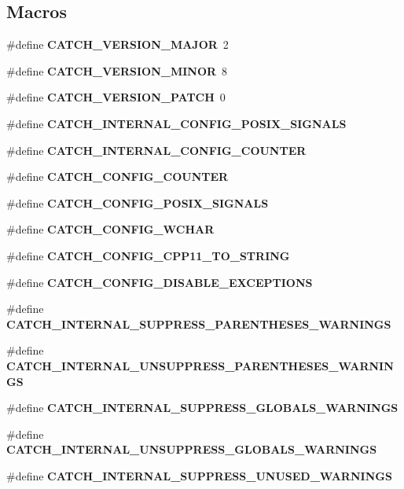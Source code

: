 \subsection*{Macros}
\begin{DoxyCompactItemize}
\item 
\#define \textbf{ C\+A\+T\+C\+H\+\_\+\+V\+E\+R\+S\+I\+O\+N\+\_\+\+M\+A\+J\+OR}~2
\item 
\#define \textbf{ C\+A\+T\+C\+H\+\_\+\+V\+E\+R\+S\+I\+O\+N\+\_\+\+M\+I\+N\+OR}~8
\item 
\#define \textbf{ C\+A\+T\+C\+H\+\_\+\+V\+E\+R\+S\+I\+O\+N\+\_\+\+P\+A\+T\+CH}~0
\item 
\#define \textbf{ C\+A\+T\+C\+H\+\_\+\+I\+N\+T\+E\+R\+N\+A\+L\+\_\+\+C\+O\+N\+F\+I\+G\+\_\+\+P\+O\+S\+I\+X\+\_\+\+S\+I\+G\+N\+A\+LS}
\item 
\#define \textbf{ C\+A\+T\+C\+H\+\_\+\+I\+N\+T\+E\+R\+N\+A\+L\+\_\+\+C\+O\+N\+F\+I\+G\+\_\+\+C\+O\+U\+N\+T\+ER}
\item 
\#define \textbf{ C\+A\+T\+C\+H\+\_\+\+C\+O\+N\+F\+I\+G\+\_\+\+C\+O\+U\+N\+T\+ER}
\item 
\#define \textbf{ C\+A\+T\+C\+H\+\_\+\+C\+O\+N\+F\+I\+G\+\_\+\+P\+O\+S\+I\+X\+\_\+\+S\+I\+G\+N\+A\+LS}
\item 
\#define \textbf{ C\+A\+T\+C\+H\+\_\+\+C\+O\+N\+F\+I\+G\+\_\+\+W\+C\+H\+AR}
\item 
\#define \textbf{ C\+A\+T\+C\+H\+\_\+\+C\+O\+N\+F\+I\+G\+\_\+\+C\+P\+P11\+\_\+\+T\+O\+\_\+\+S\+T\+R\+I\+NG}
\item 
\#define \textbf{ C\+A\+T\+C\+H\+\_\+\+C\+O\+N\+F\+I\+G\+\_\+\+D\+I\+S\+A\+B\+L\+E\+\_\+\+E\+X\+C\+E\+P\+T\+I\+O\+NS}
\item 
\#define \textbf{ C\+A\+T\+C\+H\+\_\+\+I\+N\+T\+E\+R\+N\+A\+L\+\_\+\+S\+U\+P\+P\+R\+E\+S\+S\+\_\+\+P\+A\+R\+E\+N\+T\+H\+E\+S\+E\+S\+\_\+\+W\+A\+R\+N\+I\+N\+GS}
\item 
\#define \textbf{ C\+A\+T\+C\+H\+\_\+\+I\+N\+T\+E\+R\+N\+A\+L\+\_\+\+U\+N\+S\+U\+P\+P\+R\+E\+S\+S\+\_\+\+P\+A\+R\+E\+N\+T\+H\+E\+S\+E\+S\+\_\+\+W\+A\+R\+N\+I\+N\+GS}
\item 
\#define \textbf{ C\+A\+T\+C\+H\+\_\+\+I\+N\+T\+E\+R\+N\+A\+L\+\_\+\+S\+U\+P\+P\+R\+E\+S\+S\+\_\+\+G\+L\+O\+B\+A\+L\+S\+\_\+\+W\+A\+R\+N\+I\+N\+GS}
\item 
\#define \textbf{ C\+A\+T\+C\+H\+\_\+\+I\+N\+T\+E\+R\+N\+A\+L\+\_\+\+U\+N\+S\+U\+P\+P\+R\+E\+S\+S\+\_\+\+G\+L\+O\+B\+A\+L\+S\+\_\+\+W\+A\+R\+N\+I\+N\+GS}
\item 
\#define \textbf{ C\+A\+T\+C\+H\+\_\+\+I\+N\+T\+E\+R\+N\+A\+L\+\_\+\+S\+U\+P\+P\+R\+E\+S\+S\+\_\+\+U\+N\+U\+S\+E\+D\+\_\+\+W\+A\+R\+N\+I\+N\+GS}

\end{DoxyCompactItemize}
